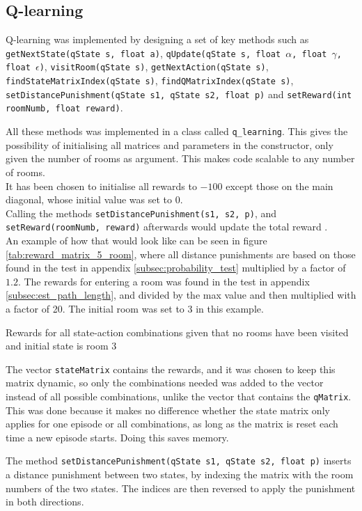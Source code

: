\documentclass[../Head/Main.tex]{subfiles}
\begin{document}
\subsection{Q-learning}
Q-learning was implemented by designing a set of key methods such as \texttt{getNextState(qState s, float a)}, \texttt{qUpdate(qState s, float $\alpha$, float $\gamma$, float $\epsilon$)}, \texttt{visitRoom(qState s)}, \texttt{getNextAction(qState s)}, \texttt{findStateMatrixIndex(qState s)}, \texttt{findQMatrixIndex(qState s)}, \texttt{setDistancePunishment(qState s1, qState s2, float p)} and \texttt{setReward(int roomNumb, float reward)}.\par 

All these methods was implemented in a class called \texttt{q\_learning}. This gives the possibility of initialising all matrices and parameters in the constructor, only given the number of rooms as argument. This makes code scalable to any number of rooms.\\
It has been chosen to initialise all rewards to $-100$ except those on the main diagonal, whose initial value was set to $0$.\\
Calling the methods \texttt{setDistancePunishment(s1, s2, p)}, and \texttt{setReward(roomNumb, reward)} afterwards would update the total reward .\\
An example of how that would look like can be seen in figure \ref{tab:reward_matrix_5_room}, where all distance punishments are based on those found in the test in appendix \ref{subsec:probability_test} multiplied by a factor of $1.2$. The rewards for entering a room was found in the test in appendix \ref{subsec:est_path_length}, and divided by the max value and then multiplied with a factor of 20. The initial room was set to 3 in this example.
\begin{table}[H]
	\centering
	
	\caption{Rewards for all state-action combinations given that no rooms have been visited and initial state is room 3}
	\label{tab:reward_matrix_5_room}
\end{table}
The vector \texttt{stateMatrix} contains the rewards, and it was chosen to keep this matrix dynamic, so only the combinations needed was added to the vector instead of all possible combinations, unlike the vector that contains the \texttt{qMatrix}. This was done because it makes no difference whether the state matrix only applies for one episode or all combinations, as long as the matrix is reset each time a new episode starts. Doing this saves memory.\par  
The method \texttt{setDistancePunishment(qState s1, qState s2, float p)} inserts a distance punishment between two states, by indexing the matrix with the room numbers of the two states. The indices are then reversed to apply the punishment in both directions.\par 
\end{document}
